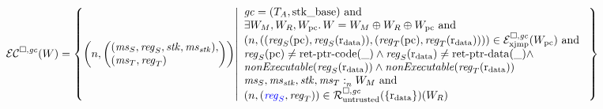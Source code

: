 \documentclass[a4paper]{article}
\begin{document}
\[
  \lrec(W) = \left\{ \npair{\left(
        \arraycolsep=0pt\array{l}
        (\ms_S,\reg_S,\stk,\ms_\stk),\\
        (\ms_T,\reg_T)\endarray\right)} \middle|
    \begin{array}{l}
      \gc = (\ta,\stkb) \tand\\
      \exists W_M,W_R,W_\pcreg \ldotp W = W_M \oplus W_R \oplus W_\pcreg \tand\\
      \npair{( (\reg_S(\pcreg),\reg_S(\rdata)), (\reg_T(\pcreg),\reg_T(\rdata)) )} \in \lrexj(W_\pcreg) \tand \\
      \reg_S(\pcreg) \neq \retptrc(\_) \wedge 
      \reg_S(\rdata) \neq \retptrd(\_) \wedge \\
      \nonExec{\reg_S(\rdata)} \wedge
      \nonExec{\reg_T(\rdata)}\\
      \memSat{\ms_S,\ms_\stk,\stk,\ms_T}{W_M} \tand\\
      \npair{\stpair{\reg}{\reg}} \in \lrr(\{\rdata\})(W_R)
    \end{array}
            \right\}
\]
\end{document}
